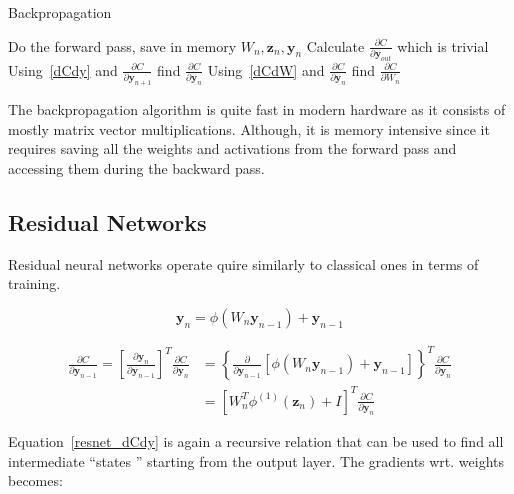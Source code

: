 \documentclass{article}
\begin{document}
    \begin{algorithm}
        \caption{Backpropagation}
        \label{alg:backprop}
        \begin{algorithmic}
            \State Do the forward pass, save in memory $W_n, \textbf{z}_n, \textbf{y}_n$
            \State Calculate $\frac{\partial C}{\partial \textbf{y}_{out}}$ which is trivial
                \State Using~\eqref{dCdy} and  $\frac{\partial C}{\partial \textbf{y}_{n+1}} $ find $\frac{\partial C}{\partial \textbf{y}_n}$
                \State  Using~\eqref{dCdW} and $\frac{\partial C}{\partial \textbf{y}_n}$ find $\frac{\partial C}{\partial W_n}$
            \EndFor
        \end{algorithmic}
    \end{algorithm}

    The backpropagation algorithm is quite fast in modern hardware as it consists of mostly matrix vector multiplications.
    Although, it is memory intensive since it requires saving all the weights and activations from the forward pass and accessing them during the backward pass.

    \subsection{Residual Networks}
    Residual neural networks operate quire similarly to classical ones in terms of training.

    \begin{equation}
        \bm{y}_{n} = \phi( W_{n} \bm{y}_{n-1} ) + \bm{y}_{n-1}
    \end{equation}

    \begin{align}
        \label{resnet_dCdy}
        \frac{ \partial C}{\partial \textbf{y}_{n-1} }
        =
        \left[ \frac{ \partial \textbf{y}_{n}}{\partial \textbf{y}_{n-1}  } \right]^T
        \frac{ \partial C}{\partial \textbf{y}_{n} }
        &=
        \left\{
        \frac{ \partial }{\partial \textbf{y}_{n-1}}
           \left[
               \phi( W_n \textbf{y}_{n-1} ) + \textbf{y}_{n-1}
           \right]
        \right\}^T
        \frac{ \partial C}{ \partial \textbf{y}_{n} }
        \\
        &=
        \left[
            W_n^T \phi^{(1)}( \pmb{z}_n ) + I
        \right]^T
        \frac{ \partial C}{\partial \textbf{y}_{n} }
    \end{align}

    Equation~\eqref{resnet_dCdy} is again a recursive relation that can be used to find all intermediate ``states '' starting from the output layer.
    The gradients wrt.
    weights becomes:
\end{document}
